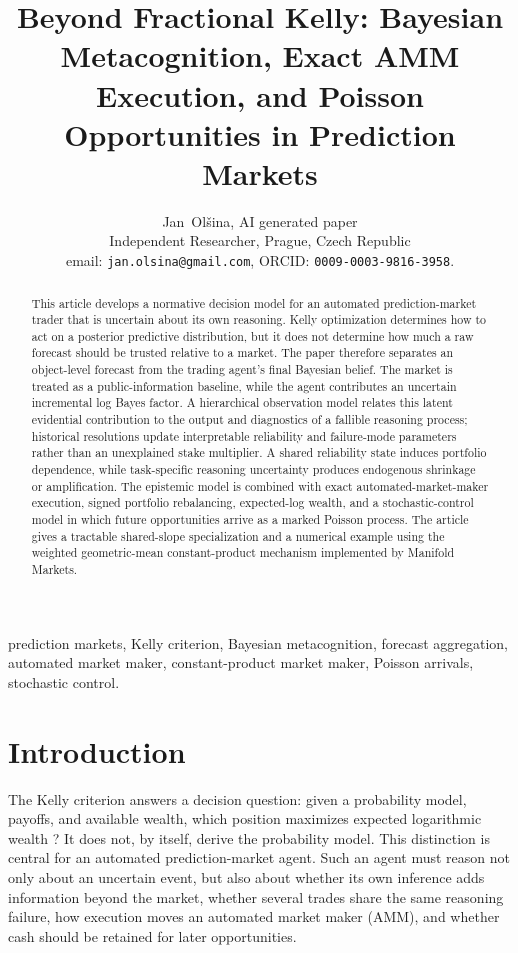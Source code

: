\documentclass[journal,a4paper]{IEEEtran}
\begin{document}
\title{Beyond Fractional Kelly: Bayesian Metacognition, Exact AMM Execution, and Poisson Opportunities in Prediction Markets}

\author{Jan~Ol\v{s}ina, AI generated paper\\[1ex]
Independent Researcher, Prague, Czech Republic\\
email: \texttt{jan.olsina@gmail.com}, ORCID: \texttt{0009-0003-9816-3958}.}

\maketitle

\begin{abstract}
This article develops a normative decision model for an automated prediction-market trader that is uncertain about its own reasoning. Kelly optimization determines how to act on a posterior predictive distribution, but it does not determine how much a raw forecast should be trusted relative to a market. The paper therefore separates an object-level forecast from the trading agent's final Bayesian belief. The market is treated as a public-information baseline, while the agent contributes an uncertain incremental log Bayes factor. A hierarchical observation model relates this latent evidential contribution to the output and diagnostics of a fallible reasoning process; historical resolutions update interpretable reliability and failure-mode parameters rather than an unexplained stake multiplier. A shared reliability state induces portfolio dependence, while task-specific reasoning uncertainty produces endogenous shrinkage or amplification. The epistemic model is combined with exact automated-market-maker execution, signed portfolio rebalancing, expected-log wealth, and a stochastic-control model in which future opportunities arrive as a marked Poisson process. The article gives a tractable shared-slope specialization and a numerical example using the weighted geometric-mean constant-product mechanism implemented by Manifold Markets.
\end{abstract}

\begin{IEEEkeywords}
prediction markets, Kelly criterion, Bayesian metacognition, forecast aggregation, automated market maker, constant-product market maker, Poisson arrivals, stochastic control.
\end{IEEEkeywords}

\section{Introduction}
The Kelly criterion answers a decision question: given a probability model, payoffs, and available wealth, which position maximizes expected logarithmic wealth \cite{kelly1956,coverthomas2006,maclean2011}? It does not, by itself, derive the probability model. This distinction is central for an automated prediction-market agent. Such an agent must reason not only about an uncertain event, but also about whether its own inference adds information beyond the market, whether several trades share the same reasoning failure, how execution moves an automated market maker (AMM), and whether cash should be retained for later opportunities.
\end{document}
